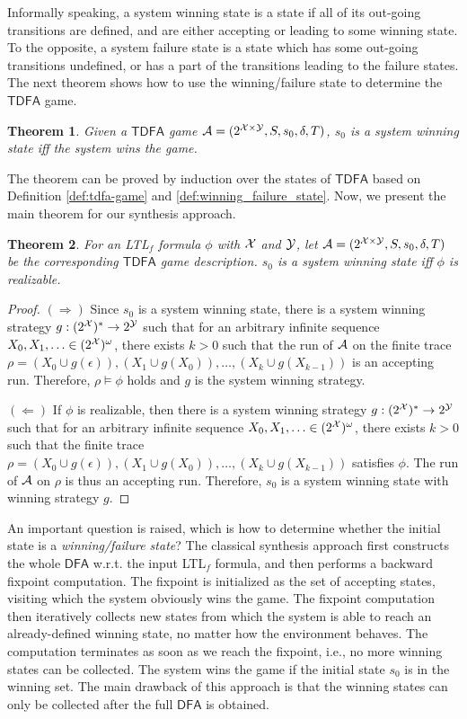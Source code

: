 \documentclass[letterpaper]{article} %
\newcommand{\ltlf}{\textsf{LTL}$_f$\xspace}
\newtheorem{theorem}{Theorem}
\def\dfa{$\mathsf{DFA}$\xspace}
\def\tdfa{$\mathsf{TDFA}$\xspace}
\begin{document}
Informally speaking, a system winning state is a state if all of its out-going transitions are defined, and are either accepting or leading to some winning state. To the opposite, a system failure state is a state which has some out-going transitions undefined, or has a part of the transitions leading to the failure states. The next theorem shows how to use the winning/failure state to determine the \tdfa game.
 

\begin{theorem}\label{thm:winning-and-failure}
Given a \tdfa game $\mathcal{A} =(2^{\mathcal{X} \times \mathcal{Y}},S,s_0,\delta,T)$, $s_0$ is a system winning state iff the system wins the game.
\end{theorem}
The theorem can be proved by induction over the states of \tdfa based on Definition \ref{def:tdfa-game} and \ref{def:winning_failure_state}. Now, we present the main theorem for our synthesis approach. 

\begin{theorem}\label{thm:system-and-game}
For an \ltlf formula $\phi$ with $\mathcal{X}$ and $\mathcal{Y}$, let $\mathcal{A} =(2^{\mathcal{X} \times \mathcal{Y}},S,s_0,\delta,T)$ be the corresponding \tdfa game description. $s_0$ is a system winning state iff $\phi$ is realizable.
\end{theorem}
\begin{proof}
$(\Rightarrow)$ Since $s_0$ is a system winning state, there is a system winning strategy $g: (2^{\mathcal{X}})^* \rightarrow 2^{\mathcal{Y}}$ such that for an arbitrary infinite sequence $X_0,X_1,\ldots\in (2^{\mathcal{X}})^{\omega}$, there exists $k > 0$ such that the run of $\mathcal{A}$ on the finite trace $\rho=(X_0\cup g(\epsilon)),(X_1\cup g(X_0)), \ldots, (X_k\cup g(X_{k-1}))$  is an accepting run. Therefore, $\rho \models \phi$ holds and $g$ is the system winning strategy.

$(\Leftarrow)$ If $\phi$ is realizable, then there is a system winning strategy $g: (2^{\mathcal{X}})^* \rightarrow 2^{\mathcal{Y}}$ such that for an arbitrary infinite sequence $X_0,X_1,\ldots\in (2^{\mathcal{X}})^{\omega}$, there exists $k > 0$ such that the finite trace $\rho=(X_0\cup g(\epsilon)),(X_1\cup g(X_0)), \ldots, (X_k\cup g(X_{k-1}))$ satisfies $\phi$. The run of $\mathcal{A}$ on $\rho$ is thus an accepting run. Therefore, $s_0$ is a system winning state with winning strategy $g$.
\end{proof}

An important question is raised, which is how to determine whether the initial state is a \emph{winning/failure state}? The classical synthesis approach \cite{GV15} first constructs the whole \dfa w.r.t. the input \ltlf formula, and then performs a backward fixpoint computation. The fixpoint is initialized as the set of accepting states, visiting which the system obviously wins the game. The fixpoint computation then iteratively collects new states from which the system is able to reach an already-defined winning state, no matter how the environment behaves. The computation terminates as soon as we reach the fixpoint, i.e., no more winning states can be collected. The system wins the game if the initial state $s_0$ is in the winning set. The main drawback of this approach is that the winning states can only be collected after the full \dfa is obtained.  
\end{document}
